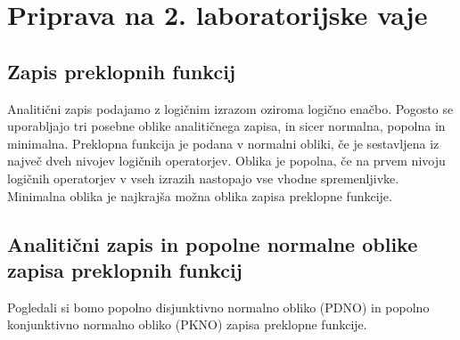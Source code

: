\chapter{Priprava na 2. laboratorijske vaje}

\section{Zapis preklopnih funkcij}


Analitični zapis podajamo z logičnim izrazom oziroma logično enačbo. Pogosto se uporabljajo tri posebne oblike analitičnega zapisa, in sicer normalna, popolna in minimalna. Preklopna funkcija je podana v normalni obliki, če je sestavljena iz največ dveh nivojev logičnih operatorjev. Oblika je popolna, če na prvem nivoju logičnih operatorjev v vseh izrazih nastopajo vse vhodne spremenljivke. Minimalna oblika je najkrajša možna oblika zapisa preklopne funkcije.

\section{Analitični zapis in popolne normalne oblike zapisa preklopnih funkcij}

Pogledali si bomo popolno disjunktivno normalno obliko (PDNO) in popolno konjunktivno normalno obliko (PKNO) zapisa preklopne funkcije.

